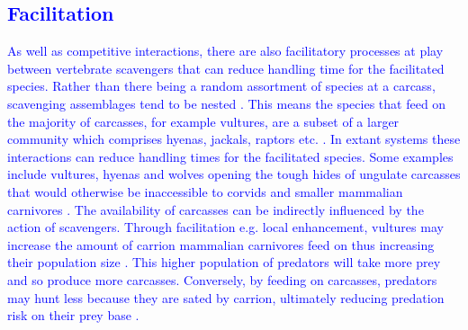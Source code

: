 \documentclass[a4paper,12pt]{article}
\begin{document}
\textcolor{blue}{\subsection{Facilitation}
As well as competitive interactions, there are also facilitatory processes at play between vertebrate scavengers that can reduce handling time for the facilitated species. 
Rather than there being a random assortment of species at a carcass, scavenging assemblages tend to be nested \citep{selva2007nested}. 
This means the species that feed on the majority of carcasses, for example vultures, are a subset of a larger community which comprises hyenas, jackals, raptors etc. \citep{sebastian2016nested}. 
In extant systems these interactions can reduce handling times for the facilitated species. 
Some examples include vultures, hyenas and wolves opening the tough hides of ungulate carcasses that would otherwise be inaccessible to corvids and smaller mammalian carnivores \citep{selva2003scavenging,moleon2015carcass}.
The availability of carcasses can be indirectly influenced by the action of scavengers. 
Through facilitation e.g. local enhancement, vultures may increase the amount of carrion mammalian carnivores feed on thus increasing their population size \citep{moleon2014inter}. 
This higher population of predators will take more prey and so produce more carcasses. Conversely, by feeding on carcasses, predators may hunt less because they are sated by carrion, ultimately reducing predation risk on their prey base \citep{moleon2014inter}.}
\end{document}
